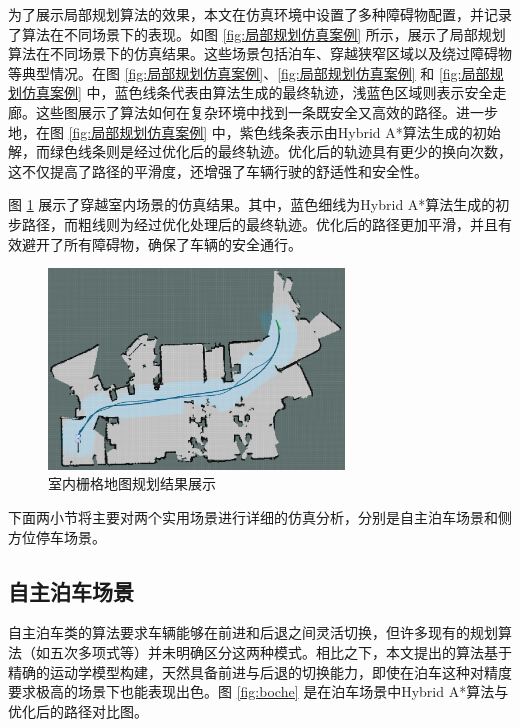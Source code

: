 \documentclass[master,academic]{ysuthesis} %
\begin{document}
	为了展示局部规划算法的效果，本文在仿真环境中设置了多种障碍物配置，并记录了算法在不同场景下的表现。如图 \ref{fig:局部规划仿真案例} 所示，展示了局部规划算法在不同场景下的仿真结果。这些场景包括泊车、穿越狭窄区域以及绕过障碍物等典型情况。在图 \ref{fig:局部规划仿真案例}、\ref{fig:局部规划仿真案例} 和 \ref{fig:局部规划仿真案例} 中，蓝色线条代表由算法生成的最终轨迹，浅蓝色区域则表示安全走廊。这些图展示了算法如何在复杂环境中找到一条既安全又高效的路径。进一步地，在图 \ref{fig:局部规划仿真案例} 中，紫色线条表示由Hybrid A*算法生成的初始解，而绿色线条则是经过优化后的最终轨迹。优化后的轨迹具有更少的换向次数，这不仅提高了路径的平滑度，还增强了车辆行驶的舒适性和安全性。

	图 \ref{fig:nmpcyuewa1} 展示了穿越室内场景的仿真结果。其中，蓝色细线为Hybrid A*算法生成的初步路径，而粗线则为经过优化处理后的最终轨迹。优化后的路径更加平滑，并且有效避开了所有障碍物，确保了车辆的安全通行。
	\begin{figure}[H]
		\centering
		\includegraphics[width=0.7\textwidth]{nmpcyuewa1.png}
		\caption{室内栅格地图规划结果展示}
		\label{fig:nmpcyuewa1}
	\end{figure}

	下面两小节将主要对两个实用场景进行详细的仿真分析，分别是自主泊车场景和侧方位停车场景。

		\subsection{自主泊车场景}
		自主泊车类的算法要求车辆能够在前进和后退之间灵活切换，但许多现有的规划算法（如五次多项式等）并未明确区分这两种模式。相比之下，本文提出的算法基于精确的运动学模型构建，天然具备前进与后退的切换能力，即使在泊车这种对精度要求极高的场景下也能表现出色。图 \ref{fig:boche} 是在泊车场景中Hybrid A*算法与优化后的路径对比图。
		
\end{document}
